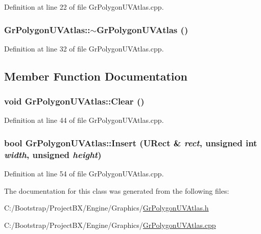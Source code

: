 Definition at line 22 of file GrPolygonUVAtlas.cpp.\hypertarget{class_gr_polygon_u_v_atlas_e1cf21d5b675d7c589b9a2b46a7bd6a1}{
\subsubsection[{$\sim$GrPolygonUVAtlas}]{\setlength{\rightskip}{0pt plus 5cm}GrPolygonUVAtlas::$\sim$GrPolygonUVAtlas ()}}
\label{class_gr_polygon_u_v_atlas_e1cf21d5b675d7c589b9a2b46a7bd6a1}




Definition at line 32 of file GrPolygonUVAtlas.cpp.

\subsection{Member Function Documentation}
\hypertarget{class_gr_polygon_u_v_atlas_62580d706b7506a2a71adbe408f94474}{
\subsubsection[{Clear}]{\setlength{\rightskip}{0pt plus 5cm}void GrPolygonUVAtlas::Clear ()}}
\label{class_gr_polygon_u_v_atlas_62580d706b7506a2a71adbe408f94474}




Definition at line 44 of file GrPolygonUVAtlas.cpp.\hypertarget{class_gr_polygon_u_v_atlas_b62ec49b06ce84c6d400bcb129f48995}{
\subsubsection[{Insert}]{\setlength{\rightskip}{0pt plus 5cm}bool GrPolygonUVAtlas::Insert ({\bf URect} \& {\em rect}, \/  unsigned int {\em width}, \/  unsigned {\em height})}}
\label{class_gr_polygon_u_v_atlas_b62ec49b06ce84c6d400bcb129f48995}




Definition at line 54 of file GrPolygonUVAtlas.cpp.

The documentation for this class was generated from the following files:\begin{CompactItemize}
\item 
C:/Bootstrap/ProjectBX/Engine/Graphics/\hyperlink{_gr_polygon_u_v_atlas_8h}{GrPolygonUVAtlas.h}\item 
C:/Bootstrap/ProjectBX/Engine/Graphics/\hyperlink{_gr_polygon_u_v_atlas_8cpp}{GrPolygonUVAtlas.cpp}\end{CompactItemize}
